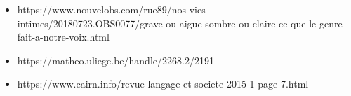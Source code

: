 \documentclass[a4paper,12pt]{article}
\begin{document}
   
\begin{itemize}
   \item https://www.nouvelobs.com/rue89/nos-vies-intimes/20180723.OBS0077/grave-ou-aigue-sombre-ou-claire-ce-que-le-genre-fait-a-notre-voix.html
   \item https://matheo.uliege.be/handle/2268.2/2191
   \item https://www.cairn.info/revue-langage-et-societe-2015-1-page-7.html
\end{itemize}
\end{document}
